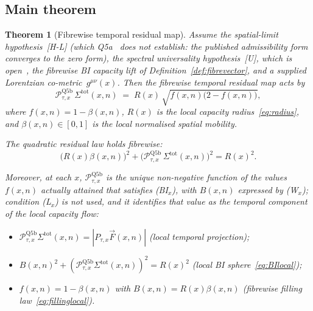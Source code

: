 \documentclass[11pt,a4paper]{article}
\newtheorem{theorem}{Theorem}[section]
\begin{document}
  \subsection{Main theorem}

    \begin{theorem}[Fibrewise temporal residual map]\label{thm:main}
      Assume the spatial-limit hypothesis~\textup{[H-L]} (which Q5a~\cite{Beau2026q5a} does not establish:
      the published admissibility form converges to the zero form),
      the spectral universality hypothesis~\textup{[U]}, which is open~\cite{Beau2026u1},
      the fibrewise BI capacity lift of Definition~\ref{def:fibrevector},
      and a supplied Lorentzian co-metric~$g^{\mu\nu}(x)$.
      Then the fibrewise temporal residual map acts by
      \begin{equation}\label{eq:main}
        \mathcal{P}_{\tau,x}^{\mathrm{Q5b}}\,\Sigma^{\mathrm{tot}}(x,n)
        \;=\; R(x)\,\sqrt{f(x,n)\bigl(2-f(x,n)\bigr)},
      \end{equation}
      where $f(x,n) = 1-\beta(x,n)$, $R(x)$ is the local capacity radius~\eqref{eq:radius},
      and $\beta(x,n) \in [0,1]$ is the local normalised spatial mobility.

      The quadratic residual law holds fibrewise:
      \begin{equation}\label{eq:quadratic-local}
        \bigl(R(x)\beta(x,n)\bigr)^2
        + \bigl(\mathcal{P}_{\tau,x}^{\mathrm{Q5b}}\,\Sigma^{\mathrm{tot}}(x,n)\bigr)^2
        = R(x)^2.
      \end{equation}

      Moreover, at each $x$, $\mathcal{P}_{\tau,x}^{\mathrm{Q5b}}$ is the unique non-negative function of the
      values $f(x,n)$ actually attained that satisfies \textup{(BI$_x$)}, with $B(x,n)$ expressed by
      \textup{(W$_x$)}; condition \textup{(L$_x$)} is not used, and it identifies that value as the temporal
      component of the local capacity flow:
      \begin{itemize}
        \item[\textup{(L$_x$)}] $\mathcal{P}_{\tau,x}^{\mathrm{Q5b}}\Sigma^{\mathrm{tot}}(x,n)
        = |P_{\tau,x}\vec{F}(x,n)|$ (local temporal projection);
        \item[\textup{(BI$_x$)}] $B(x,n)^2 + (\mathcal{P}_{\tau,x}^{\mathrm{Q5b}}
        \Sigma^{\mathrm{tot}}(x,n))^2 = R(x)^2$ (local BI sphere~\eqref{eq:BIlocal});
        \item[\textup{(W$_x$)}] $f(x,n) = 1-\beta(x,n)$ with
        $B(x,n) = R(x)\beta(x,n)$ (fibrewise filling law~\eqref{eq:fillinglocal}).
      \end{itemize}
    \end{theorem}
\end{document}
